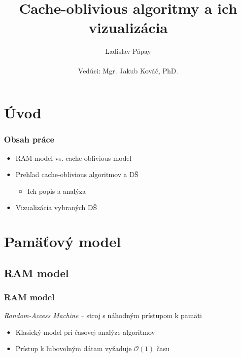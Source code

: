 \documentclass{beamer}
\title{Cache-oblivious algoritmy a ich vizualizácia}
\author[Ladislav Pápay]{Ladislav Pápay \\ ~ \\ Vedúci: Mgr. Jakub Kováč, PhD.}
\date{}
\newcommand{\bigO}{\ensuremath{\mathcal{O}}}
\begin{document}
\frame{\titlepage}

\section{Úvod}
\begin{frame}
    \frametitle{Obsah práce}
    \begin{itemize}
        \item RAM model vs. cache-oblivious model
        \item Prehľad cache-oblivious algoritmov a DŠ
        \begin{itemize}
            \item Ich popis a analýza
        \end{itemize}
        \item Vizualizácia vybraných DŠ
    \end{itemize}
\end{frame}

\section{Pamäťový model}
\subsection{RAM model}
\begin{frame}
    \frametitle{RAM model}%
    \emph{Random-Access Machine} -- stroj s náhodným prístupom k pamäti
    \begin{itemize}
        \item Klasický model pri časovej analýze algoritmov
        \item Prístup k ľubovolným dátam vyžaduje $\bigO(1)$ času
    \end{itemize}
\end{frame}
\end{document}
